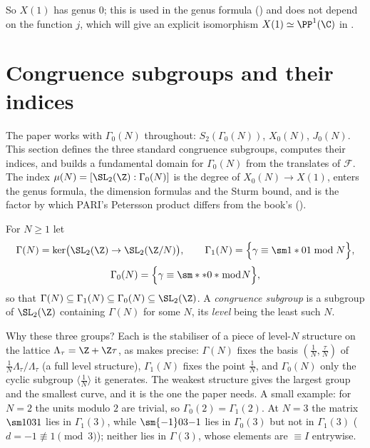 So $X(1)$ has genus $0$; this is used in the genus formula () and does not depend on the function $j$, which will give an
explicit isomorphism $X(1)\simeq\PP^1(\C)$ in .

\section{Congruence subgroups and their indices}\label{sec:modforms:congruence-subgroups}

The paper works with $\Gamma_0(N)$ throughout: $S_2(\Gamma_0(N))$, $X_0(N)$, $J_0(N)$. This section defines the three standard congruence subgroups,
computes their indices, and builds a fundamental domain for $\Gamma_0(N)$ from the translates of $\mathcal F$. The index $\mu(N)=[\SL_2(\Z):\Gamma_0(N)]$ is the
degree of $X_0(N)\to X(1)$, enters the genus formula, the dimension formulas and the Sturm bound, and is the factor by which PARI's Petersson product differs
from the book's ().

\begin{definition}\label{def:modforms:congruence-subgroups}
For $N\ge1$ let
\[
\Gamma(N)=\ker\bigl(\SL_2(\Z)\to\SL_2(\Z/N)\bigr),\qquad\Gamma_1(N)=\Bigl\{\gamma\equiv\sm1*01\bmod N\Bigr\},
\]
\[
\Gamma_0(N)=\Bigl\{\gamma\equiv\sm**0*\bmod N\Bigr\},
\]
so that $\Gamma(N)\subseteq\Gamma_1(N)\subseteq\Gamma_0(N)\subseteq\SL_2(\Z)$. A \emph{congruence subgroup} is a subgroup of $\SL_2(\Z)$ containing $\Gamma(N)$ for some $N$, its
\emph{level} being the least such $N$.
\end{definition}

Why these three groups? Each is the stabiliser of a piece of level-$N$ structure on the lattice $\Lambda_\tau=\Z+\Z\tau$, as  makes precise:
$\Gamma(N)$ fixes the basis $(\frac1N,\frac\tau N)$ of $\frac1N\Lambda_\tau/\Lambda_\tau$ (a full level structure), $\Gamma_1(N)$ fixes the point $\frac1N$, and $\Gamma_0(N)$ only the
cyclic subgroup $\langle\frac1N\rangle$ it generates. The weakest structure gives the largest group and the smallest curve, and it is the one the paper needs. A small example:
for $N=2$ the units modulo $2$ are trivial, so $\Gamma_0(2)=\Gamma_1(2)$. At $N=3$ the matrix $\sm1031$ lies in $\Gamma_1(3)$, while $\sm{-1}03{-1}$ lies in
$\Gamma_0(3)$ but not in $\Gamma_1(3)$ ($d=-1\not\equiv1\pmod3$); neither lies in $\Gamma(3)$, whose elements are $\equiv I$ entrywise.


